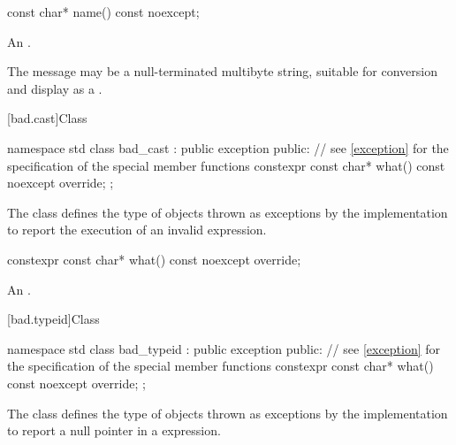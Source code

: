 %
\begin{itemdecl}
const char* name() const noexcept;
\end{itemdecl}

\begin{itemdescr}
\pnum
\returns
An  \ntbs{}.

\pnum
\remarks
The message may be a null-terminated multibyte string,
suitable for conversion and display as a
.
\end{itemdescr}

[bad.cast]{Class }

%
%
\begin{codeblock}
namespace std {
  class bad_cast : public exception {
  public:
    // see \ref{exception} for the specification of the special member functions
    constexpr const char* what() const noexcept override;
  };
}
\end{codeblock}

\pnum
The class
defines the type of objects thrown
as exceptions by the implementation to report the execution of an invalid
%
expression.

%
\begin{itemdecl}
constexpr const char* what() const noexcept override;
\end{itemdecl}

\begin{itemdescr}
\pnum
\returns
An  \ntbs{}.
\end{itemdescr}

[bad.typeid]{Class }

%
%
\begin{codeblock}
namespace std {
  class bad_typeid : public exception {
  public:
    // see \ref{exception} for the specification of the special member functions
    constexpr const char* what() const noexcept override;
  };
}
\end{codeblock}

\pnum
The class
defines the type of objects
thrown as exceptions by the implementation to report a null pointer
in a
expression.


